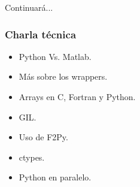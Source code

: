 \documentclass{beamer}
\begin{document}
\begin{frame}
\begin{center}
 \begin{Huge}
  Continuará...
 \end{Huge}
\end{center}
\end{frame}

\begin{frame}
 \frametitle{Charla técnica}
\begin{itemize}
 \item Python Vs. Matlab.
 \item Más sobre los wrappers.
 \item Arrays en C, Fortran y Python.
 \item GIL.
 \item Uso de F2Py.
 \item ctypes.
 \item Python en paralelo.
\end{itemize}

\end{frame}
\end{document}
